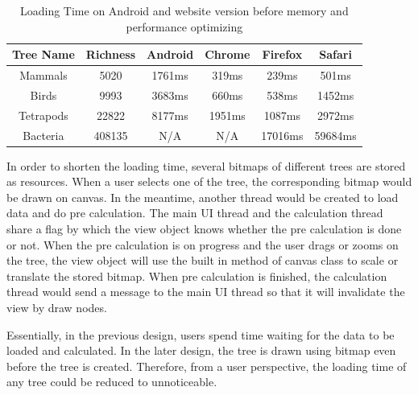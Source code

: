 \documentclass[MSc]{icldt}
\begin{document}
\begin{table} [H]
	\centering %
	\begin{tabular}{|c c c c c c|} %
		\hline %
		Tree Name & Richness  & Android & Chrome & Firefox & Safari\\%
		\hline  %
		Mammals & 5020 & 1761ms & 319ms & 239ms & 501ms \\  %
		\hline
		Birds & 9993 & 3683ms & 660ms & 538ms & 1452ms \\
		\hline
		Tetrapods & 22822 & 8177ms & 1951ms & 1087ms & 2972ms\\ 
		\hline %
		Bacteria & 408135 & N/A & N/A & 17016ms  & 59684ms\\ [1ex] %
		\hline
	\end{tabular}
	\label{table:nonlin} %
	\caption{Loading Time on Android and website version before memory and performance optimizing} %
\end{table}

In order to shorten the loading time, several bitmaps of different trees are stored as resources. When a user selects one of the tree, the corresponding bitmap would be drawn on canvas. In the meantime, another thread would be created to load data and do pre calculation. The main UI thread and the calculation thread share a flag by which the view object knows whether the pre calculation is done or not. When the pre calculation is on progress and the user drags or zooms on the tree, the view object will use the built in method of canvas class to scale or translate the stored bitmap. When pre calculation is finished, the calculation thread would send a message to the main UI thread so that it will invalidate the view by draw nodes.

Essentially, in the previous design, users spend time waiting for the data to be loaded and calculated. In the later design, the tree is drawn using bitmap even before the tree is created. Therefore, from a user perspective, the loading time of any tree could be reduced to unnoticeable. 
\end{document}
